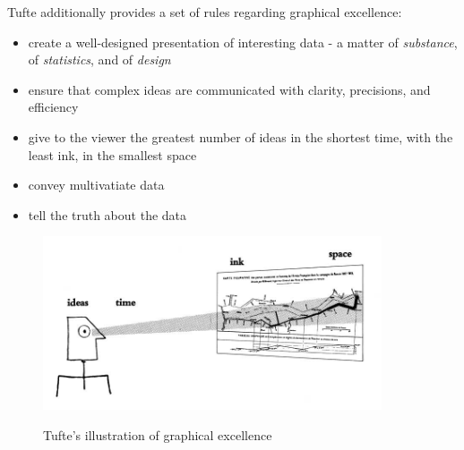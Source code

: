 \documentclass[a4paper,11pt,titlepage]{article}
\begin{document}
		Tufte additionally provides a set of rules regarding graphical excellence:
		
		\begin{itemize}
			\item create a well-designed presentation of interesting data - a matter of \textit{substance}, of \textit{statistics}, and of \textit{design}
			\item ensure that complex ideas are communicated with clarity, precisions, and efficiency
			\item give to the viewer the greatest number of ideas in the shortest time, with the least ink, in the smallest space
			\item convey multivatiate data
			\item tell the truth about the data
		\end{itemize}
		 
		\begin{figure}[H]
    			\centering	
			{{\includegraphics[width=10cm]
    				{img/graphical_excellence} 
    			}}%
    			\caption{Tufte's illustration of graphical excellence}%
    		\label{fig:TufteExcellence}
		\end{figure}

		\par 
		 
\end{document}
